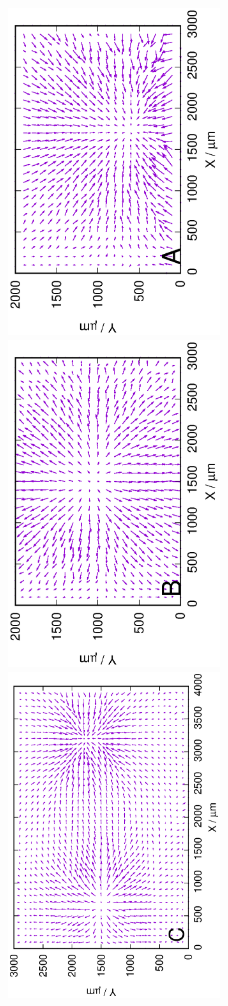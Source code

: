 \begin{figure}
\centering
\includegraphics[width=0.5\textwidth, angle=-90]{img/mérések/Fe1_h100.eps}
\includegraphics[width=0.5\textwidth, angle=-90]{img/mérések/Zn1_h100.eps}
\includegraphics[width=0.5\textwidth, angle=-90]{img/mérések/grafit1_h100.eps}


\end{figure}

